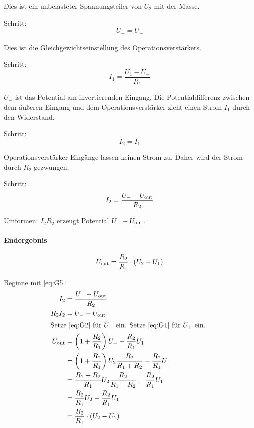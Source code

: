 Dies ist ein unbelasteter Spannungsteiler von $U_2$ mit der Masse.

Schritt:
\begin{equation}
	\label{eq:G2}
	U_- = U_+
\end{equation}

Dies ist die Gleichgewichtseinstellung des Operationsverstärkers.

Schritt:
\begin{equation}
	\label{eq:G3}
	I_1 = \frac{U_1 - U_-}{R_1}
\end{equation}

$U_-$ ist das Potential am invertierenden Eingang. Die Potentialdifferenz
zwischen dem äußeren Eingang und dem Operationsverstärker zieht einen Strom
$I_1$ durch den Widerstand.

Schritt:
\begin{equation}
	\label{eq:G4}
	I_2 = I_1
\end{equation}

Operationsverstärker-Eingänge lassen keinen Strom zu. Daher wird der Strom
durch $R_2$ gezwungen.

Schritt:
\begin{equation}
	\label{eq:G5}
	I_2 = \frac{U_- - U_\text{out}}{R_2}
\end{equation}

Umformen: $I_2 R_2$ erzeugt Potential $U_- - U_\text{out}$.

\paragraph{Endergebnis}
\[
	U_\text{out} = \frac{R_2}{R_1} \cdot (U_2 - U_1)
\]

Beginne mit \eqref{eq:G5}:
\begin{align*}
	I_2 &= \frac{U_- - \Uout}{R_2} \\
	R_2 I_2 &= U_- - \Uout \\
	\intertext{%
		Setze \eqref{eq:G2} für $U_-$ ein. Setze \eqref{eq:G1} für $U_+$ ein.
	}
	\Uout
	&= \del{1 + \frac{R_2}{R_1}} U_- - \frac{R_2}{R_1} U_1 \\
	&= \del{1 + \frac{R_2}{R_1}} U_2 \frac{R_2}{R_1 + R_2} - \frac{R_2}{R_1} U_1 \\
	&= \frac{R_1 + R_2}{R_1} U_2 \frac{R_2}{R_1 + R_2} - \frac{R_2}{R_1} U_1 \\
	&= \frac{R_2}{R_1} U_2 - \frac{R_2}{R_1} U_1 \\
	&= \frac{R_2}{R_1} \cdot (U_2 - U_1)
\end{align*}


\FloatBarrier
\IfFileExists{\bibliographyfile}{
	
}{}



